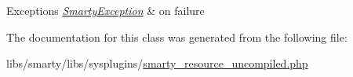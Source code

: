 \begin{DoxyExceptions}{Exceptions}
{\em \hyperlink{class_smarty_exception}{Smarty\+Exception}} & on failure \\
\hline
\end{DoxyExceptions}


The documentation for this class was generated from the following file\+:\begin{DoxyCompactItemize}
\item 
libs/smarty/libs/sysplugins/\hyperlink{smarty__resource__uncompiled_8php}{smarty\+\_\+resource\+\_\+uncompiled.\+php}\end{DoxyCompactItemize}

